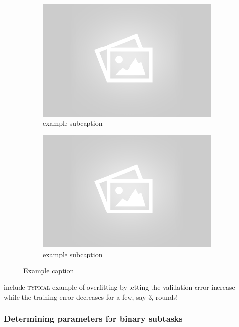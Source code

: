 	\begin{figure}[!ht]
	\centering
	\begin{subfigure}[b]{.45\textwidth}
	\centering
	\includegraphics[width=\textwidth]{mlp/placeholder.png}
	\caption{example subcaption}
	\end{subfigure}
	\quad
	\begin{subfigure}[b]{.45\textwidth}
	\centering
	\includegraphics[width=\textwidth]{mlp/placeholder.png}
	\caption{example subcaption}
	\end{subfigure}
	\caption{Example caption}
	\label{fig:overfiting}
	\end{figure}

include \textsc{typical} example of overfitting by letting the validation error increase while the training error decreases for a few, say 3, rounds!

\subsubsection{Determining parameters for binary subtasks}

